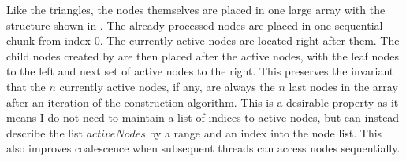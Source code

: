 
Like the triangles, the nodes themselves are placed in one large array with the
structure shown in . The already processed nodes are
placed in one sequential chunk from index 0. The currently active nodes are
located right after them. The child nodes created by
 are then placed after the active nodes, with the
leaf nodes to the left and next set of active nodes to the right. This preserves
the invariant that the $n$ currently active nodes, if any, are always the $n$
last nodes in the array after an iteration of the construction algorithm. This
is a desirable property as it means I do not need to maintain a list of indices
to active nodes, but can instead describe the list $activeNodes$ by a range and
an index into the node list. This also improves coalescence when subsequent
threads can access nodes sequentially.


